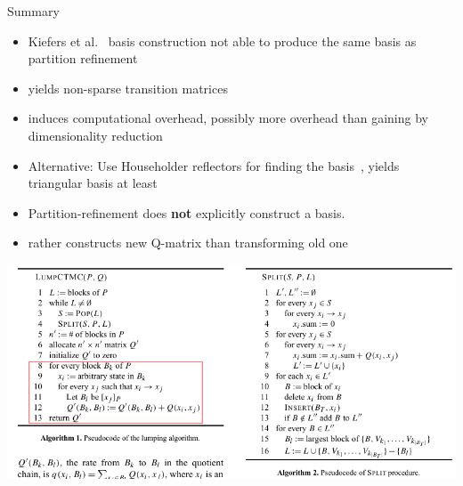 \documentclass[rgb, pdf]{beamer}
\begin{document}
        \begin{frame}[allowframebreaks]{Summary}
        \begin{itemize}
         \item Kiefers et al.~\autocite{Kiefer2013OnTC} basis construction not able to produce the same basis as partition refinement
         \item yields non-sparse transition matrices 
         \item induces computational overhead, possibly more overhead than gaining by dimensionality reduction
         \item Alternative: Use Householder reflectors for finding the basis~\autocite{kieferstab}, yields triangular basis at least
         \item Partition-refinement does \textbf{not} explicitly construct a basis.
         \item rather constructs new Q-matrix than transforming old one
        \end{itemize}
        \framebreak
         \includegraphics[height=0.8\textheight, width=\textwidth, keepaspectratio]{img/derisavi_pseudocode.png}
        \end{frame}
        
\end{document}
